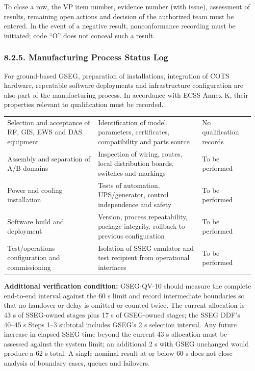 To close a row, the VP item number, evidence number (with issue), assessment of results, remaining open actions and decision of the authorized team must be entered. In the event of a negative result, nonconformance recording must be initiated; code “O” does not conceal such a result.

\subsubsection{8.2.5. Manufacturing Process Status Log}\label{ddjf-8-2-5}

For ground-based GSEG, preparation of installations, integration of COTS hardware, repeatable software deployments and infrastructure configuration are also part of the manufacturing process. In accordance with ECSS Annex K, their properties relevant to qualification must be recorded.

\begingroup{}
\begin{longtable}{|P{0.25}|P{0.45}|P{0.30}|}
\hline{}
 &  & \\ \hline
\endhead
\hline\endlastfoot
Selection and acceptance of RF, GIS, EWS and DAS equipment & Identification of model, parameters, certificates, compatibility and parts source & No qualification records\\ \hline
Assembly and separation of A/\allowbreak{}B domains & Inspection of wiring, routes, local distribution boards, switches and markings & To be performed\\ \hline
Power and cooling installation & Tests of automation, UPS/\allowbreak{}generator, control independence and safety & To be performed\\ \hline
Software build and deployment & Version, process repeatability, package integrity, rollback to previous configuration & To be performed\\ \hline
Test/\allowbreak{}operations configuration and commissioning & Isolation of SSEG emulator and test recipient from operational interfaces & To be performed\\*
\end{longtable}
\endgroup

\textbf{Additional verification condition:} GSEG-QV-10 should measure the complete end-to-end interval against the 60 s limit and record intermediate boundaries so that no handover or delay is omitted or counted twice. The current allocation is 43 s of SSEG-owned stages plus 17 s of GSEG-owned stages; the SSEG DDF's 40--45 s Steps 1--3 subtotal includes GSEG's 2 s selection interval. Any future increase in elapsed SSEG time beyond the current 43 s allocation must be assessed against the system limit; an additional 2 s with GSEG unchanged would produce a 62 s total. A single nominal result at or below 60 s does not close analysis of boundary cases, queues and failovers.

